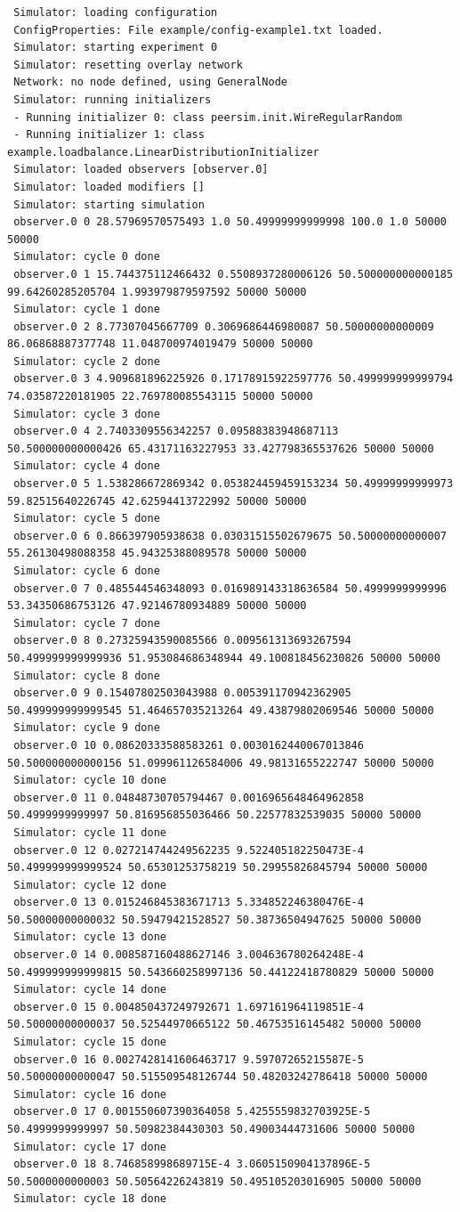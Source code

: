 \documentclass[a4paper,11pt]{article}
\begin{document}
\tiny
\begin{verbatim}
 Simulator: loading configuration
 ConfigProperties: File example/config-example1.txt loaded.
 Simulator: starting experiment 0
 Simulator: resetting overlay network
 Network: no node defined, using GeneralNode
 Simulator: running initializers
 - Running initializer 0: class peersim.init.WireRegularRandom
 - Running initializer 1: class example.loadbalance.LinearDistributionInitializer
 Simulator: loaded observers [observer.0]
 Simulator: loaded modifiers []
 Simulator: starting simulation
 observer.0 0 28.57969570575493 1.0 50.49999999999998 100.0 1.0 50000 50000
 Simulator: cycle 0 done
 observer.0 1 15.744375112466432 0.5508937280006126 50.500000000000185 99.64260285205704 1.993979879597592 50000 50000
 Simulator: cycle 1 done
 observer.0 2 8.77307045667709 0.3069686446980087 50.50000000000009 86.06868887377748 11.048700974019479 50000 50000
 Simulator: cycle 2 done
 observer.0 3 4.909681896225926 0.17178915922597776 50.499999999999794 74.03587220181905 22.769780085543115 50000 50000
 Simulator: cycle 3 done
 observer.0 4 2.7403309556342257 0.09588383948687113 50.500000000000426 65.43171163227953 33.427798365537626 50000 50000
 Simulator: cycle 4 done
 observer.0 5 1.538286672869342 0.053824459459153234 50.49999999999973 59.82515640226745 42.62594413722992 50000 50000
 Simulator: cycle 5 done
 observer.0 6 0.866397905938638 0.03031515502679675 50.50000000000007 55.26130498088358 45.94325388089578 50000 50000
 Simulator: cycle 6 done
 observer.0 7 0.485544546348093 0.016989143318636584 50.4999999999996 53.34350686753126 47.92146780934889 50000 50000
 Simulator: cycle 7 done
 observer.0 8 0.27325943590085566 0.009561313693267594 50.499999999999936 51.953084686348944 49.100818456230826 50000 50000
 Simulator: cycle 8 done
 observer.0 9 0.15407802503043988 0.005391170942362905 50.499999999999545 51.464657035213264 49.43879802069546 50000 50000
 Simulator: cycle 9 done
 observer.0 10 0.08620333588583261 0.0030162440067013846 50.500000000000156 51.099961126584006 49.98131655222747 50000 50000
 Simulator: cycle 10 done
 observer.0 11 0.04848730705794467 0.0016965648464962858 50.4999999999997 50.816956855036466 50.22577832539035 50000 50000
 Simulator: cycle 11 done
 observer.0 12 0.027214744249562235 9.522405182250473E-4 50.499999999999524 50.65301253758219 50.29955826845794 50000 50000
 Simulator: cycle 12 done
 observer.0 13 0.015246845383671713 5.334852246380476E-4 50.50000000000032 50.59479421528527 50.38736504947625 50000 50000
 Simulator: cycle 13 done
 observer.0 14 0.008587160488627146 3.004636780264248E-4 50.499999999999815 50.543660258997136 50.44122418780829 50000 50000
 Simulator: cycle 14 done
 observer.0 15 0.004850437249792671 1.697161964119851E-4 50.50000000000037 50.52544970665122 50.46753516145482 50000 50000
 Simulator: cycle 15 done
 observer.0 16 0.0027428141606463717 9.59707265215587E-5 50.50000000000047 50.515509548126744 50.48203242786418 50000 50000
 Simulator: cycle 16 done
 observer.0 17 0.001550607390364058 5.4255559832703925E-5 50.4999999999997 50.50982384430303 50.49003444731606 50000 50000
 Simulator: cycle 17 done
 observer.0 18 8.746858998689715E-4 3.0605150904137896E-5 50.5000000000003 50.50564226243819 50.495105203016905 50000 50000
 Simulator: cycle 18 done
\end{verbatim}
\end{document}
